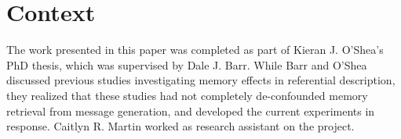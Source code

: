 \documentclass[natbib,man,a4paper]{apa6}
\begin{document}
\section*{Context}
\label{sec:org6c4624a}

The work presented in this paper was completed as part of Kieran J. O'Shea's PhD thesis, which was supervised by Dale J. Barr. While Barr and O'Shea discussed previous studies investigating memory effects in referential description, they realized that these studies had not completely de-confounded memory retrieval from message generation, and developed the current experiments in response. Caitlyn R. Martin worked as research assistant on the project.


\end{document}
